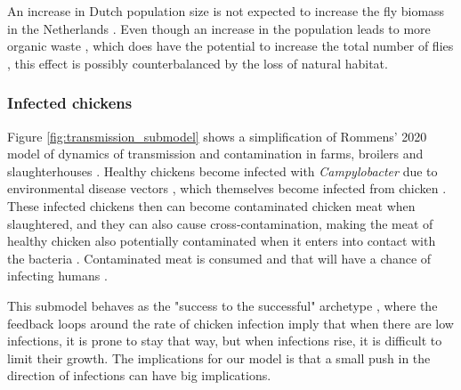 
An increase in Dutch population size is not expected to increase the fly biomass in the Netherlands \parencite{guenat_effects_2019}. Even though an increase in the population leads to more organic waste \parencite{garcia-garcia_framework_2015}, which does have the potential to increase the total number of flies \parencite{imai_population_1984, rozendaal_houseflies_1997}, this effect is possibly counterbalanced by the loss of natural habitat.



\subsubsection*{Infected chickens}
Figure \ref{fig:transmission_submodel} shows a simplification of Rommens' 2020 model of dynamics of transmission and contamination in farms, broilers and slaughterhouses \parencite{rommens_infected_2020}. Healthy chickens become infected with \textit{Campylobacter} due to environmental disease vectors \parencite{royden_role_2016}, which themselves become infected from chicken \parencite{skovgard_retention_2011}. These infected chickens then can become contaminated chicken meat when slaughtered, and they can also cause cross-contamination, making the meat of healthy chicken also potentially contaminated when it enters into contact with the bacteria \parencite{berndtson_campylobacter_1996}. Contaminated meat is consumed and that will have a chance of infecting humans \parencite{wilson_tracing_2008}. %

This submodel behaves as the "success to the successful" archetype \parencite{pruyt_triple_2013}, where the feedback loops around the rate of chicken infection imply that when there are low infections, it is prone to stay that way, but when infections rise, it is difficult to limit their growth. The implications for our model is that a small push in the direction of infections can have big implications.

